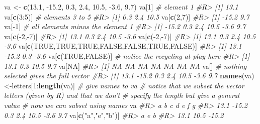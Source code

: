 \documentclass[]{book}
\newenvironment{Shaded}{}{}
\newcommand{\CommentTok}[1]{\textcolor[rgb]{0.38,0.63,0.69}{\textit{#1}}}
\newcommand{\DecValTok}[1]{\textcolor[rgb]{0.25,0.63,0.44}{#1}}
\newcommand{\FloatTok}[1]{\textcolor[rgb]{0.25,0.63,0.44}{#1}}
\newcommand{\KeywordTok}[1]{\textcolor[rgb]{0.00,0.44,0.13}{\textbf{#1}}}
\newcommand{\NormalTok}[1]{#1}
\newcommand{\OperatorTok}[1]{\textcolor[rgb]{0.40,0.40,0.40}{#1}}
\newcommand{\OtherTok}[1]{\textcolor[rgb]{0.00,0.44,0.13}{#1}}
\newcommand{\StringTok}[1]{\textcolor[rgb]{0.25,0.44,0.63}{#1}}
\theoremstyle{definition}
\theoremstyle{definition}
\theoremstyle{definition}
\theoremstyle{remark}
\begin{document}
\begin{Shaded}
\begin{Highlighting}[]
\NormalTok{va <-}\StringTok{ }\KeywordTok{c}\NormalTok{(}\FloatTok{13.1}\NormalTok{, }\FloatTok{-15.2}\NormalTok{, }\FloatTok{0.3}\NormalTok{, }\FloatTok{2.4}\NormalTok{, }\FloatTok{10.5}\NormalTok{, }\FloatTok{-3.6}\NormalTok{, }\FloatTok{9.7}\NormalTok{)}
\NormalTok{va[}\DecValTok{1}\NormalTok{] }\CommentTok{# element 1}
\CommentTok{#R> [1] 13.1}
\NormalTok{va[}\KeywordTok{c}\NormalTok{(}\DecValTok{3}\OperatorTok{:}\DecValTok{5}\NormalTok{)] }\CommentTok{# elements 3 to 5}
\CommentTok{#R> [1]  0.3  2.4 10.5}
\NormalTok{va[}\KeywordTok{c}\NormalTok{(}\DecValTok{2}\NormalTok{,}\DecValTok{7}\NormalTok{)]}
\CommentTok{#R> [1] -15.2   9.7}
\NormalTok{va[}\OperatorTok{-}\DecValTok{1}\NormalTok{] }\CommentTok{# all elements minus the element 1}
\CommentTok{#R> [1] -15.2   0.3   2.4  10.5  -3.6   9.7}
\NormalTok{va[}\KeywordTok{c}\NormalTok{(}\OperatorTok{-}\DecValTok{2}\NormalTok{,}\OperatorTok{-}\DecValTok{7}\NormalTok{)]}
\CommentTok{#R> [1] 13.1  0.3  2.4 10.5 -3.6}
\NormalTok{va[}\KeywordTok{c}\NormalTok{(}\OperatorTok{-}\DecValTok{2}\NormalTok{,}\OperatorTok{-}\DecValTok{7}\NormalTok{)]}
\CommentTok{#R> [1] 13.1  0.3  2.4 10.5 -3.6}
\NormalTok{va[}\KeywordTok{c}\NormalTok{(}\OtherTok{TRUE}\NormalTok{,}\OtherTok{TRUE}\NormalTok{,}\OtherTok{TRUE}\NormalTok{,}\OtherTok{FALSE}\NormalTok{,}\OtherTok{FALSE}\NormalTok{,}\OtherTok{TRUE}\NormalTok{,}\OtherTok{FALSE}\NormalTok{)] }
\CommentTok{#R> [1]  13.1 -15.2   0.3  -3.6}
\NormalTok{va[}\KeywordTok{c}\NormalTok{(}\OtherTok{TRUE}\NormalTok{,}\OtherTok{FALSE}\NormalTok{)] }\CommentTok{# notice the recycling at play here}
\CommentTok{#R> [1] 13.1  0.3 10.5  9.7}
\NormalTok{va[}\OtherTok{NA}\NormalTok{] }
\CommentTok{#R> [1] NA NA NA NA NA NA NA}
\NormalTok{va[] }\CommentTok{# nothing selected gives the full vector}
\CommentTok{#R> [1]  13.1 -15.2   0.3   2.4  10.5  -3.6   9.7}
\KeywordTok{names}\NormalTok{(va)<-letters[}\DecValTok{1}\OperatorTok{:}\KeywordTok{length}\NormalTok{(va)] }\CommentTok{# give names to va}
\CommentTok{# notice that we subset the vector letters (given by R) and that we don't}
\CommentTok{# specify the length but give a general value}
\CommentTok{# now we can subset using names}
\NormalTok{va}
\CommentTok{#R>     a     b     c     d     e     f     g }
\CommentTok{#R>  13.1 -15.2   0.3   2.4  10.5  -3.6   9.7}
\NormalTok{va[}\KeywordTok{c}\NormalTok{(}\StringTok{"a"}\NormalTok{,}\StringTok{"e"}\NormalTok{,}\StringTok{"b"}\NormalTok{)]}
\CommentTok{#R>     a     e     b }
\CommentTok{#R>  13.1  10.5 -15.2}
\end{Highlighting}
\end{Shaded}
\end{document}

